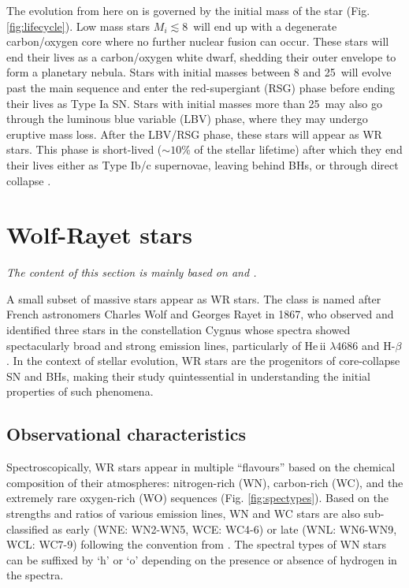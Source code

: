 The evolution from here on is governed by the initial mass of the star (Fig. \ref{fig:lifecycle}). Low mass stars $M_i \lesssim 8\,$\Msun{} will end up with a degenerate carbon/oxygen core where no further nuclear fusion can occur. These stars will end their lives as a carbon/oxygen white dwarf, shedding their outer envelope to form a planetary nebula. Stars with initial masses between 8 and 25\,\Msun{} will evolve past the main sequence and enter the red-supergiant (RSG) phase before ending their lives as Type Ia SN. Stars with initial masses more than 25\,\Msun{} may also go through the luminous blue variable (LBV) phase, where they may undergo eruptive mass loss. After the LBV/RSG phase, these stars will appear as WR stars. This phase is short-lived (${\sim}10$\% of the stellar lifetime) after which they end their lives either as Type Ib/c supernovae, leaving behind BHs, or through direct collapse \citep{heger_how_2003}.  
 

\section{Wolf-Rayet stars}

\textit{The content of this section is mainly based on \citet{crowther_physical_2007} and \citet{langer_presupernova_2012}.}

A small subset of massive stars appear as WR stars. The class is named after French astronomers Charles Wolf and Georges Rayet in 1867, who observed and identified three stars in the constellation Cygnus whose spectra showed spectacularly broad and strong emission lines, particularly of He\,{\sc ii} $\lambda 4686$ and H-$\beta$. In the context of stellar evolution, WR stars are the progenitors of core-collapse SN and BHs, making their study quintessential in understanding the initial properties of such phenomena. 

\subsection{Observational characteristics}

Spectroscopically, WR stars appear in multiple ``flavours'' based on the chemical composition of their atmospheres: nitrogen-rich (WN), carbon-rich (WC), and the extremely rare oxygen-rich (WO) sequences (Fig. \ref{fig:spectypes}). Based on the strengths and ratios of various emission lines, WN and WC stars are also sub-classified as early (WNE: WN2-WN5, WCE: WC4-6) or late (WNL: WN6-WN9, WCL: WC7-9) following the convention from \citet{smith_revised_1968}. The spectral types of WN stars can be suffixed by `h' or `o' depending on the presence or absence of hydrogen in the spectra.

